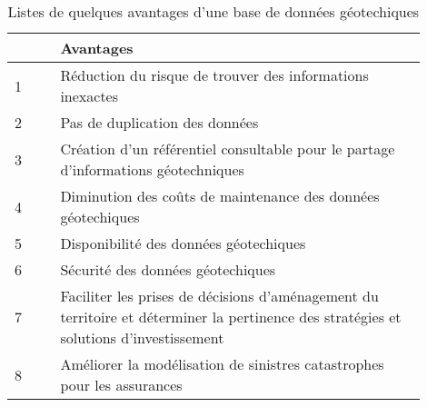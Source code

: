 \par    
\begin{table}
        \centering
        \begin{tabular}{|p{0.10\linewidth}|p{0.80\linewidth}|}
        \hline
                \textbf{ } & \textbf{Avantages} \\
                \hline
                    1 &
                    Réduction du risque de trouver des informations inexactes
                    \\
                \hline 
                    2 &
                    Pas de duplication des données
                    \\
                \hline 
                    3 &
                    Création d'un référentiel consultable pour le partage d’informations géotechniques
                    \\
                \hline 
                    4 &
                    Diminution des coûts de maintenance des données géotechiques
                    \\
                \hline 
                    5 &
                    Disponibilité des données géotechiques
                    \\
                \hline 
                    6 &
                    Sécurité des données géotechiques
                    \\
                \hline 
                    7 &
                    Faciliter les prises de décisions d’aménagement du territoire 
                    et déterminer la pertinence des stratégies et solutions d’investissement
                    \\
                \hline 
                    8 &
                    Améliorer la modélisation de sinistres catastrophes pour les assurances
                    \\
            \hline 
        \end{tabular}
        \caption{Listes de quelques avantages d'une base de données géotechiques} \label{tab:avantages}
\end{table}
\par
